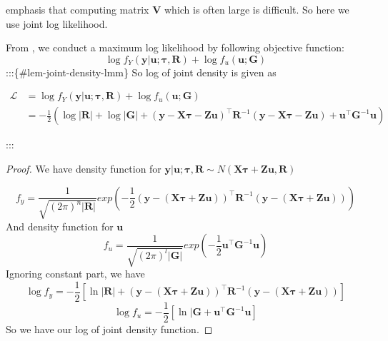 \documentclass[
  a4paper,
  oneside,
  openany,
  12pt,
  onecolumn]{book}
\theoremstyle{plain}
\theoremstyle{definition}
\theoremstyle{remark}
\begin{document}
\citet{henderson1959estimation} emphasis that computing matrix
\(\boldsymbol{V}\) which is often large is difficult. So here we use
joint log likelihood.

From \citet{butler2013optimal}, we conduct a maximum log likelihood by
following objective function: \[
\log f_Y(\boldsymbol{y}|\boldsymbol{u};\boldsymbol{\tau},\boldsymbol{R})+\log f_u(\boldsymbol{u};\boldsymbol{G})
\] :::\{\#lem-joint-density-lmm\} So log of joint density is given as

\[\begin{aligned}
\mathscr{L}&=\log f_Y(\boldsymbol{y}|\boldsymbol{u};\boldsymbol{\tau},\boldsymbol{R})+\log f_u(\boldsymbol{u};\boldsymbol{G})\\
&=-\frac{1}{2}\left(\log|\boldsymbol{R}|+\log|\boldsymbol{G}|+(\boldsymbol{y}-\boldsymbol{X}\boldsymbol{\tau}-\boldsymbol{Z}\boldsymbol{u})^\top \mathbf{R}^{-1}(\boldsymbol{y}-\boldsymbol{X}\boldsymbol{\tau}-\boldsymbol{Z}\boldsymbol{u})+\boldsymbol{u}^\top\boldsymbol{G}^{-1}\boldsymbol{u}\right)
\end{aligned}\]

:::

\begin{proof}
We have density function for
\(\boldsymbol{y}|\boldsymbol{u};\boldsymbol{\tau},\boldsymbol{R}\sim N(\boldsymbol{X}\boldsymbol{\tau}+\boldsymbol{Z}\boldsymbol{u},\boldsymbol{R})\)

\[
f_y = \frac{1}{\sqrt{(2\pi)^{n}|\boldsymbol{R}|}}exp(-\frac{1}{2}(\boldsymbol{y}-(\boldsymbol{X}\boldsymbol{\tau}+\boldsymbol{Z}\boldsymbol{u}))^\top\boldsymbol{R}^{-1}(\boldsymbol{y}-(\boldsymbol{X}\boldsymbol{\tau}+\boldsymbol{Z}\boldsymbol{u})))
\] And density function for \(\boldsymbol{u}\) \[
f_u = \frac{1}{\sqrt{(2\pi)^{l}|\boldsymbol{G}|}}exp(-\frac{1}{2}\boldsymbol{u}^\top\boldsymbol{G}^{-1}\boldsymbol{u})
\] Ignoring constant part, we have \[
\log f_y=-\frac{1}{2}[\ln |\boldsymbol{R}|+(\boldsymbol{y}-(\boldsymbol{X}\boldsymbol{\tau}+\boldsymbol{Z}\boldsymbol{u}))^\top\boldsymbol{R}^{-1}(\boldsymbol{y}-(\boldsymbol{X}\boldsymbol{\tau}+\boldsymbol{Z}\boldsymbol{u}))]
\] \[
\log f_u = -\frac{1}{2}[\ln |\boldsymbol{G}+\boldsymbol{u}^\top\boldsymbol{G}^{-1}\boldsymbol{u}]
\] So we have our log of joint density function.
\end{proof}
\end{document}
